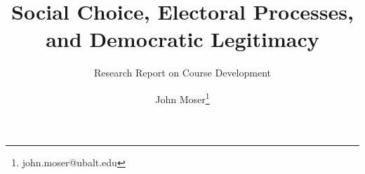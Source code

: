 \documentclass[twoside,titlepage,12pt,appendixprefix=true]{scrreprt}
\begin{document}
    \author{John Moser\thanks{john.moser@ubalt.edu}}

    \title{Social Choice, Electoral Processes, and Democratic Legitimacy}
    \subtitle{Research Report on Course Development}
    \maketitle
    \addtocounter{page}{-1}
    \tableofcontents
    \clearpage
    
    
    \printbibliography

    
\end{document}
